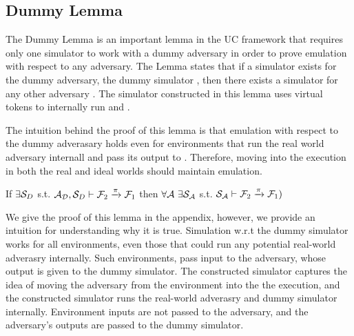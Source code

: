 \subsection{Dummy Lemma}
The Dummy Lemma is an important lemma in the UC framework that requires only one simulator to work with a dummy adversary in order to prove emulation with respect to any adversary.
The Lemma states that if a simulator exists for the dummy adversary, the dummy simulator \DS, then there exists a simulator for any other adversary \A. 
The simulator constructed in this lemma uses virtual tokens to internally run \DS and \A.

The intuition behind the proof of this lemma is that emulation with respect to the dummy adverasary holds even for environments that run the real world adversary internall and pass its output to \DS. 
Therefore, moving \A into the execution in both the real and ideal worlds should maintain emulation.

\begin{theorem}\label{thm:dummy}
If $\exists \mathcal{S}_{D}$ s.t. $ \mathcal{A}_\mathcal{D}, \mathcal{S}_{D} \vdash \mathcal{F}_2 \xrightarrow{\pi} \mathcal{F}_1$ then $\forall \mathcal{A} \ \exists \mathcal{S}_\mathcal{A}$ s.t. $\mathcal{S}_{\mathcal{A}} \vdash  \mathcal{F}_2 \xrightarrow{\pi} \mathcal{F}_1)$ 
\end{theorem}

We give the proof of this lemma in the appendix, however, we provide an intuition for understanding why it is true.
Simulation w.r.t the dummy simulator works for all environments, even those that could run any potential real-world adverasry internally. Such environments, pass input to the adversary, whose output is given to the dummy simulator. 
The constructed simulator captures the idea of moving the adversary from the environment into the the execution, and the constructed simulator runs the real-world adverasry and dummy simulator internally.
Environment inputs are not passed to the adversary, and the adversary's outputs are passed to the dummy simulator.

